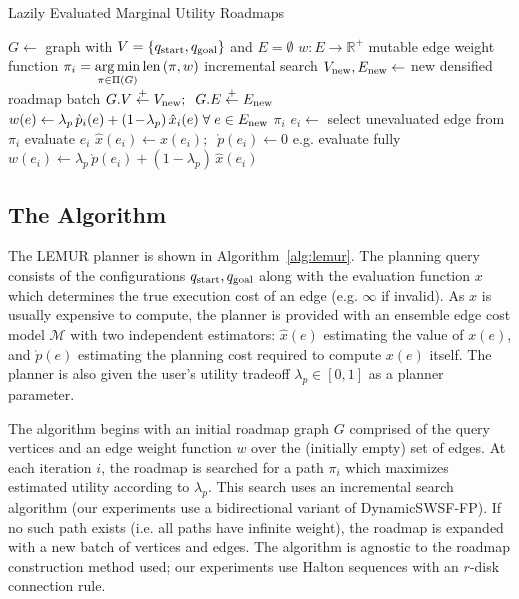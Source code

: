 \begin{algorithm}[t]
\caption{Lazily Evaluated Marginal Utility Roadmaps}
\label{alg:lemur}
\begin{algorithmic}[1]
\State $G \leftarrow$ graph with
   $V = \{ q_{\mbox{\scriptsize start}}, q_{\mbox{\scriptsize goal}} \}$
   and $E = \emptyset$
\State $w : E \rightarrow \mathbb{R}^{+}$
   \Comment mutable edge weight function
   \State $\pi_i = \displaystyle\operatorname*{arg\,min}_{\pi \in \Pi(G)} 
      \mbox{len}\left(\pi, w\right)$
      \Comment incremental search
      \State $V_{\mbox{\scriptsize new}}, E_{\mbox{\scriptsize new}} \leftarrow$ new densified roadmap batch
      \State $G.V \stackrel{\tiny +}\leftarrow V_{\mbox{\scriptsize new}};
         \;\; G.E \stackrel{\tiny +}\leftarrow E_{\mbox{\scriptsize new}}$
      \State $w(e) \leftarrow \lambda_p \, \grave{p}_i(e) + (1\!-\!\lambda_p) \, \hat{x}_i(e)
         \; \forall \; e \in E_{\mbox{\scriptsize new}}$
   \EndIf
      \State \Return $\pi_i$
   \EndIf
   \State $e_i \leftarrow$ select unevaluated edge from $\pi_i$
   \State evaluate $e_i$
   \State $\hat{x}(e_i) \leftarrow x(e_i); \;\; \grave{p}(e_i) \leftarrow 0$
      \Comment e.g. evaluate fully
   \State $w(e_i) \leftarrow
      \lambda_p \, \grave{p}(e_i) + (1\!-\!\lambda_p) \, \hat{x}(e_i)$
\EndFor
\EndProcedure
\end{algorithmic}
\end{algorithm}

\subsection{The Algorithm}

The LEMUR planner is shown in Algorithm~\ref{alg:lemur}.
The planning query consists of the configurations
$q_{\mbox{\scriptsize start}}, q_{\mbox{\scriptsize goal}}$
along with the evaluation function $x$ which determines the true
execution cost of an edge (e.g. $\infty$ if invalid).
As $x$ is usually expensive to compute,
the planner is provided with an ensemble edge cost model $\mathcal{M}$
with two independent estimators:
$\hat{x}(e)$ estimating the value of $x(e)$,
and $\grave{p}(e)$ estimating the planning cost required to
compute $x(e)$ itself.
The planner is also given the user's utility tradeoff
$\lambda_p \in [0,1]$ as a planner parameter.

The algorithm begins with an initial roadmap graph $G$
comprised of the query vertices
and an edge weight function $w$ over the (initially empty) set
of edges.
At each iteration $i$,
the roadmap is searched for a path $\pi_i$
which maximizes estimated utility according to $\lambda_p$.
This search uses an incremental search algorithm
(our experiments use a bidirectional variant of DynamicSWSF-FP).
If no such path exists
(i.e. all paths have infinite weight),
the roadmap is expanded with a new batch of vertices and edges.
The algorithm is agnostic to the roadmap construction method used;
our experiments use Halton sequences with an $r$-disk connection rule.

